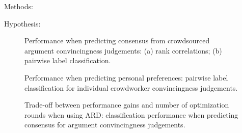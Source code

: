 Methods: 

Hypothesis: 

\begin{figure}
\caption{Performance when predicting consensus from crowdsourced argument convincingness judgements:
(a) rank correlations; (b) pairwise label classification.
}
\end{figure}

\begin{figure}
\caption{Performance when predicting personal preferences: pairwise label classification for individual crowdworker
convincingness judgements.
}
\end{figure}

\begin{figure}
\caption{Trade-off between performance gains and number of optimization rounds when using ARD:
classification performance when predicting consensus for argument convincingness judgements. 
}
\end{figure}

